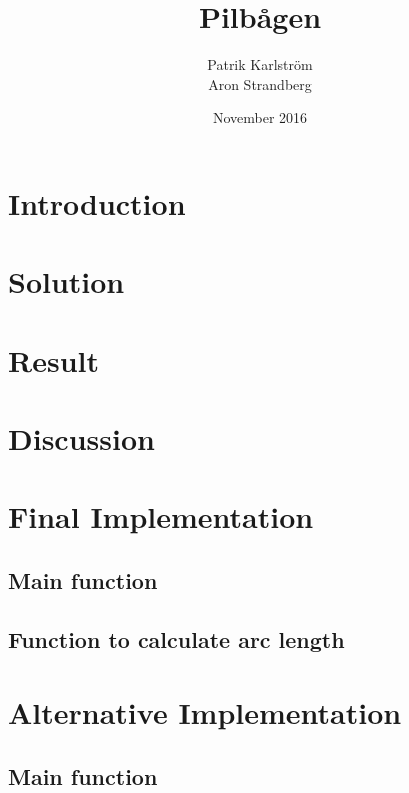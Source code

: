 \documentclass{article}
\title{Pilbågen}
\author{Patrik Karlström \\ Aron Strandberg }
\date{November 2016}
\begin{document}
\maketitle

\section{Introduction}



\section{Solution}



\section{Result}



\section{Discussion}



\newpage
\appendix
\section{Final Implementation} \label{app:Appendix A}

\subsection{Main function}


\subsection{Function to calculate arc length}


\section{Alternative Implementation} \label{app:Appendix B}

\subsection{Main function}

\end{document}
